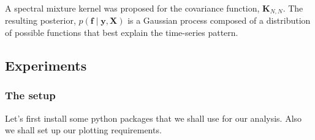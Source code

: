 \documentclass[11pt]{article}
\begin{document}
A spectral mixture kernel was proposed for the covariance function,
\(\textbf{K}_{N,N}\). The resulting posterior,
\(p(\textbf{f}\mid \textbf{y},\textbf{X})\) is a Gaussian process
composed of a distribution of possible functions that best explain the
time-series pattern.

    \subsection{Experiments}\label{experiments}

    \subsubsection{The setup}\label{the-setup}

Let's first install some python packages that we shall use for our
analysis. Also we shall set up our plotting requirements.
\end{document}
